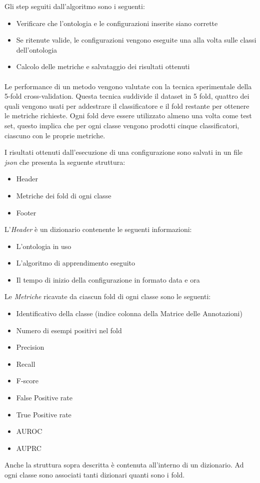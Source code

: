 \documentclass[12pt,a4paper,oneside,hidelinks]{report}
\begin{document}
Gli step seguiti dall'algoritmo sono i seguenti:

\begin{itemize}
    \item Verificare che l'ontologia e le configurazioni inserite siano corrette
    \item Se ritenute valide, le configurazioni vengono eseguite una alla volta sulle classi dell'ontologia
    \item Calcolo delle metriche e salvataggio dei risultati ottenuti
\end{itemize}

\paragraph*{}
Le performance di un metodo vengono valutate con la tecnica sperimentale della 5-fold cross-validation. Questa tecnica suddivide il dataset in 5 fold, quattro dei quali vengono usati per addestrare il classificatore e il fold restante per ottenere le metriche richieste. Ogni fold deve essere utilizzato almeno una volta come test set, questo implica che per ogni classe vengono prodotti cinque classificatori, ciascuno con le proprie metriche.

I risultati ottenuti dall'esecuzione di una configurazione sono salvati in un file \textit{json} che presenta la seguente struttura:

\begin{itemize}
    \item Header
    \item Metriche dei fold di ogni classe
    \item Footer
\end{itemize}
L'\textit{Header} è un dizionario contenente le seguenti informazioni:
\begin{itemize}
    \item L'ontologia in uso
    \item L'algoritmo di apprendimento eseguito
    \item Il tempo di inizio della configurazione in formato data e ora
\end{itemize}
Le \textit{Metriche} ricavate da ciascun fold di ogni classe sono le seguenti:
\begin{itemize}
    \item Identificativo della classe (indice colonna della Matrice delle Annotazioni)
    \item Numero di esempi positivi nel fold
    \item Precision
    \item Recall
    \item F-score
    \item False Positive rate
    \item True Positive rate
    \item AUROC
    \item AUPRC
\end{itemize}
Anche la struttura sopra descritta è contenuta all'interno di un dizionario. Ad ogni classe sono associati tanti dizionari quanti sono i fold.
\end{document}
